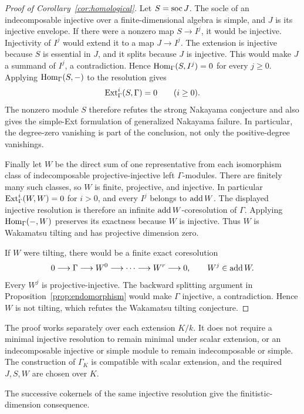 \begin{proof}[Proof of Corollary~\ref{cor:homological}]
Let $S=\operatorname{soc} J$. The socle of an indecomposable injective over a
finite-dimensional algebra is simple, and $J$ is its injective
envelope. If there were a nonzero map $S\to I^j$, it would be
injective. Injectivity of $I^j$ would extend it to a map $J\to I^j$.
The extension is injective because $S$ is essential in $J$, and it
splits because $J$ is injective. This would make $J$ a summand of
$I^j$, a contradiction. Hence $\operatorname{Hom}_\Gamma(S,I^j)=0$ for every
$j\geq0$. Applying $\operatorname{Hom}_\Gamma(S,-)$ to the resolution gives
\[
 \operatorname{Ext}_\Gamma^i(S,\Gamma)=0\qquad(i\geq0).
\]
The nonzero module $S$ therefore refutes the strong Nakayama conjecture
and also gives the simple-Ext formulation of generalized Nakayama
failure. In particular, the degree-zero vanishing is part of the
conclusion, not only the positive-degree vanishings.

Finally let $W$ be the direct sum of one representative from each
isomorphism class of indecomposable projective-injective left
$\Gamma$-modules. There are finitely many such classes, so $W$ is
finite, projective, and injective. In particular
$\operatorname{Ext}_\Gamma^i(W,W)=0$ for $i>0$, and every $I^j$ belongs to
$\operatorname{add} W$. The displayed injective resolution is therefore an
infinite $\operatorname{add} W$-coresolution of $\Gamma$. Applying
$\operatorname{Hom}_\Gamma(-,W)$ preserves its exactness because $W$ is injective.
Thus $W$ is Wakamatsu tilting and has projective dimension zero.

If $W$ were tilting, there would be a finite exact coresolution
\[
 0\longrightarrow\Gamma\longrightarrow W^0\longrightarrow\cdots
 \longrightarrow W^r\longrightarrow0,\qquad W^j\in\operatorname{add} W.
\]
Every $W^j$ is projective-injective. The backward splitting argument
in Proposition~\ref{prop:endomorphism} would make $\Gamma$ injective,
a contradiction. Hence $W$ is not tilting, which refutes the Wakamatsu
tilting conjecture.
\end{proof}

The proof works separately over each extension $K/k$. It does not
require a minimal injective resolution to remain minimal under scalar
extension, or an indecomposable injective or simple module to remain
indecomposable or simple. The construction of $\Gamma_K$ is compatible
with scalar extension, and the required $J,S,W$ are chosen over $K$.

The successive cokernels of the same injective resolution give the
finitistic-dimension consequence.

